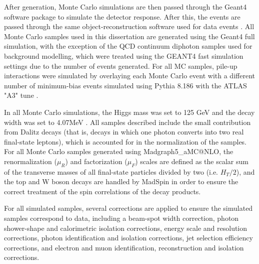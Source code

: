 After generation, Monte Carlo simulations are then passed through the Geant4 software package \cite{GEANT4} to simulate the detector response. After this, the events are passed through the same object-reconstruction software used for data events \cite{Aad_2010}. All Monte Carlo samples used in this dissertation are generated using the Geant4 full simulation, with the exception of the QCD continuum diphoton samples used for background modelling, which were treated using the GEANT4 fast simulation settings due to the number of events generated. For all MC samples, pile-up interactions were simulated by overlaying each Monte Carlo event with a different number of minimum-bias events simulated using Pythia 8.186 \cite{Pythia8.1} with the ATLAS "A3" tune \cite{A3}.

In all Monte Carlo simulations, the Higgs mass was set to 125 GeV and the decay width was set to 4.07MeV \cite{YellowReport4}. All samples described include the small contribution from Dalitz decays (that is, decays in which one photon converts into two real final-state leptons), which is accounted for in the normalization of the samples. For all Monte Carlo samples generated using Madgraph5\_aMC@NLO, the renormalization ($\mu_{R}$) and factorization ($\mu_{F}$) scales are defined as the scalar sum of the transverse masses of all final-state particles divided by two (i.e. $H_{T}/2$), and the top and W boson decays are handled by MadSpin \cite{MadSpin} in order to ensure the correct treatment of the spin correlations of the decay products.

For all simulated samples, several corrections are applied to ensure the simulated samples correspond to data, including a beam-spot width correction, photon shower-shape and calorimetric isolation corrections, energy scale and resolution corrections, photon identification and isolation corrections, jet selection efficiency corrections, and electron and muon identification, reconstruction and isolation corrections.

